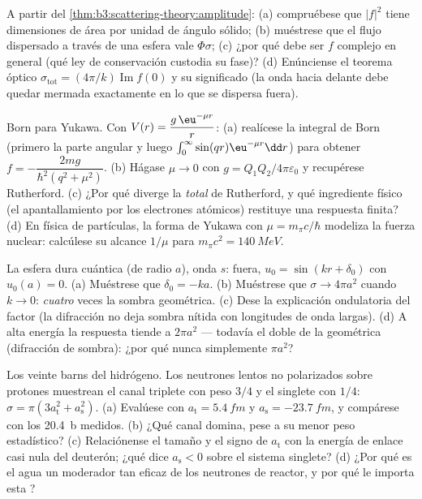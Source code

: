 \begin{exercise}[$\star$]\label{exo:b3:scattering-theory:4}
A partir del \cref{thm:b3:scattering-theory:amplitude}: (a) compruébese que
$|f|^2$ tiene dimensiones de área por unidad de ángulo sólido; (b) muéstrese
que el flujo dispersado a través de una esfera vale $\Phi\sigma$; (c) ¿por
qué debe ser $f$ complejo en general (qué ley de conservación custodia su
fase)? (d) Enúnciense el teorema óptico $\sigma_{\text{tot}} =
(4\pi/k)\operatorname{Im}f(0)$ y su significado (la onda hacia delante debe
quedar mermada exactamente en lo que se dispersa fuera).
\end{exercise}

\begin{exercise}[$\star\star$]\label{exo:b3:scattering-theory:5}
Born para Yukawa. Con $V(r) = \dfrac{g\,\eu^{-\mu r}}{r}$: (a)
realícese la integral de Born (primero la parte angular y luego $\int_0^
\infty\sin(qr)\eu^{-\mu r}\dd r$) para obtener $f = -\dfrac{2mg}
{\hbar^2(q^2 + \mu^2)}$. (b) Hágase $\mu \to 0$ con $g =
Q_1Q_2/4\pi\varepsilon_0$ y recupérese Rutherford. (c) ¿Por qué diverge la
 \emph{total} de Rutherford, y qué ingrediente físico (el
apantallamiento por los electrones atómicos) restituye una respuesta
finita? (d) En física de partículas, la forma de Yukawa con $\mu =
m_\pi c/\hbar$ modeliza la fuerza nuclear: calcúlese su alcance
$1/\mu$ para $m_\pi c^2 = \qty{140}{MeV}$.
\end{exercise}

\begin{exercise}[$\star\star$]\label{exo:b3:scattering-theory:6}
La esfera dura cuántica (de radio $a$), onda $s$: fuera, $u_0 =
\sin(kr + \delta_0)$ con $u_0(a) = 0$. (a) Muéstrese que $\delta_0 = -ka$.
(b) Muéstrese que $\sigma \to 4\pi a^2$ cuando $k \to 0$: \emph{cuatro}
veces la sombra geométrica. (c) Dese la explicación ondulatoria del factor
(la difracción no deja sombra nítida con longitudes de onda largas). (d) A
alta energía la respuesta tiende a $2\pi a^2$ --- todavía el doble de la
geométrica (difracción de sombra): ¿por qué nunca simplemente $\pi a^2$?
\end{exercise}

\begin{exercise}[$\star\star$]\label{exo:b3:scattering-theory:7}
Los veinte barns del hidrógeno. Los neutrones lentos no polarizados sobre
protones muestrean el canal triplete con peso $3/4$ y el
singlete con $1/4$: $\sigma = \pi(3a_{\text{t}}^2 +
a_{\text{s}}^2)$. (a) Evalúese con $a_{\text{t}} = \qty{5.4}{fm}$ y
$a_{\text{s}} = \qty{-23.7}{fm}$, y compárese con los \qty{20.4}{b}
medidos. (b) ¿Qué canal domina, pese a su menor peso
estadístico? (c) Relaciónense el tamaño y el signo de $a_{\text{t}}$ con la
energía de enlace casi nula del deuterón; ¿qué dice $a_{\text{s}} < 0$
sobre el sistema singlete? (d) ¿Por qué es el agua un moderador tan eficaz
de los neutrones de reactor, y por qué le importa esta ?
\end{exercise}

